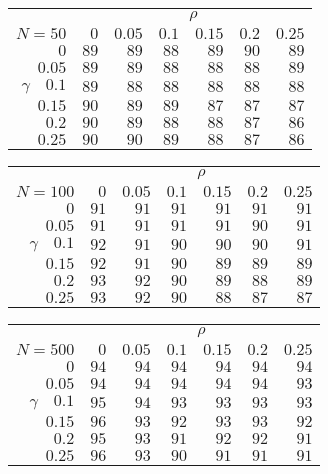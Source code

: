 \begin{tabular}{r|rrrrrr}
\hline\hline
 &\multicolumn{6}{c}{$\rho$} \\ 
 $N = 50$ & $0$ & $0.05$ & $0.1$ & $0.15$ & $0.2$ & $0.25$ \\ 
 \hline$0$ & $89$ & $89$ & $88$ & $89$ & $90$ & $89$\\ 
$0.05$ & $89$ & $89$ & $88$ & $88$ & $88$ & $89$\\ 
$\gamma\quad$$0.1$ & $89$ & $88$ & $88$ & $88$ & $88$ & $88$\\ 
$0.15$ & $90$ & $89$ & $89$ & $87$ & $87$ & $87$\\ 
$0.2$ & $90$ & $89$ & $88$ & $88$ & $87$ & $86$\\ 
$0.25$ & $90$ & $90$ & $89$ & $88$ & $87$ & $86$\\ 
 \hline 
 \end{tabular}
 
 \vspace{2em} 
 
\begin{tabular}{r|rrrrrr}
\hline\hline
 &\multicolumn{6}{c}{$\rho$} \\ 
 $N = 100$ & $0$ & $0.05$ & $0.1$ & $0.15$ & $0.2$ & $0.25$ \\ 
 \hline$0$ & $91$ & $91$ & $91$ & $91$ & $91$ & $91$\\ 
$0.05$ & $91$ & $91$ & $91$ & $91$ & $90$ & $91$\\ 
$\gamma\quad$$0.1$ & $92$ & $91$ & $90$ & $90$ & $90$ & $91$\\ 
$0.15$ & $92$ & $91$ & $90$ & $89$ & $89$ & $89$\\ 
$0.2$ & $93$ & $92$ & $90$ & $89$ & $88$ & $89$\\ 
$0.25$ & $93$ & $92$ & $90$ & $88$ & $87$ & $87$\\ 
 \hline 
 \end{tabular}
 
 \vspace{2em} 
 
\begin{tabular}{r|rrrrrr}
\hline\hline
 &\multicolumn{6}{c}{$\rho$} \\ 
 $N = 500$ & $0$ & $0.05$ & $0.1$ & $0.15$ & $0.2$ & $0.25$ \\ 
 \hline$0$ & $94$ & $94$ & $94$ & $94$ & $94$ & $94$\\ 
$0.05$ & $94$ & $94$ & $94$ & $94$ & $94$ & $93$\\ 
$\gamma\quad$$0.1$ & $95$ & $94$ & $93$ & $93$ & $93$ & $93$\\ 
$0.15$ & $96$ & $93$ & $92$ & $93$ & $93$ & $92$\\ 
$0.2$ & $95$ & $93$ & $91$ & $92$ & $92$ & $91$\\ 
$0.25$ & $96$ & $93$ & $90$ & $91$ & $91$ & $91$\\ 
 \hline 
 \end{tabular}